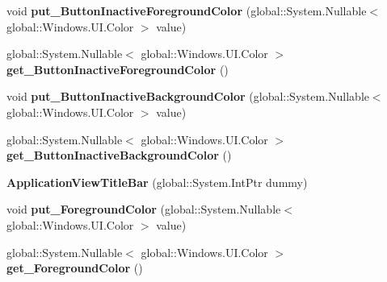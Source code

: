 \begin{DoxyCompactItemize}
void {\bfseries put\+\_\+\+Button\+Inactive\+Foreground\+Color} (global\+::\+System.\+Nullable$<$ global\+::\+Windows.\+U\+I.\+Color $>$ value)
\item 
\mbox{\label{class_windows_1_1_u_i_1_1_view_management_1_1_application_view_title_bar_a4921101b9d4e1bf1aaadc876b4855657}} 
global\+::\+System.\+Nullable$<$ global\+::\+Windows.\+U\+I.\+Color $>$ {\bfseries get\+\_\+\+Button\+Inactive\+Foreground\+Color} ()
\item 
\mbox{\label{class_windows_1_1_u_i_1_1_view_management_1_1_application_view_title_bar_a61074bacb31ca090b2114fcd7d61167b}} 
void {\bfseries put\+\_\+\+Button\+Inactive\+Background\+Color} (global\+::\+System.\+Nullable$<$ global\+::\+Windows.\+U\+I.\+Color $>$ value)
\item 
\mbox{\label{class_windows_1_1_u_i_1_1_view_management_1_1_application_view_title_bar_abafef7d0cebc7bdecdff70332dd6c825}} 
global\+::\+System.\+Nullable$<$ global\+::\+Windows.\+U\+I.\+Color $>$ {\bfseries get\+\_\+\+Button\+Inactive\+Background\+Color} ()
\item 
\mbox{\label{class_windows_1_1_u_i_1_1_view_management_1_1_application_view_title_bar_a4b9382135e40d19c25f0633e1eea3e67}} 
{\bfseries Application\+View\+Title\+Bar} (global\+::\+System.\+Int\+Ptr dummy)
\item 
\mbox{\label{class_windows_1_1_u_i_1_1_view_management_1_1_application_view_title_bar_a32a06dddb589fcc84b37bbb52d2fef56}} 
void {\bfseries put\+\_\+\+Foreground\+Color} (global\+::\+System.\+Nullable$<$ global\+::\+Windows.\+U\+I.\+Color $>$ value)
\item 
\mbox{\label{class_windows_1_1_u_i_1_1_view_management_1_1_application_view_title_bar_a0100947ed3af490212e529dba4a068e8}} 
global\+::\+System.\+Nullable$<$ global\+::\+Windows.\+U\+I.\+Color $>$ {\bfseries get\+\_\+\+Foreground\+Color} ()

\end{DoxyCompactItemize}
